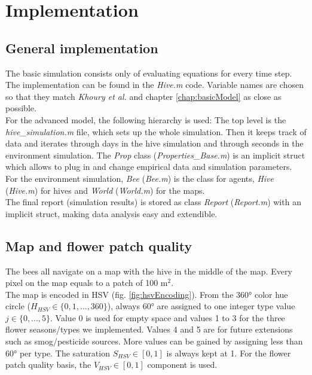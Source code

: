 \section{Implementation}
\subsection{General implementation}
	The basic simulation consists only of evaluating equations for every time step. The implementation can be found in the \textit{Hive.m} code. Variable names are chosen so that they match \textit{Khoury et al.} \cite{khoury13} and chapter \ref{chap:basicModel} as close as possible.\\
	For the advanced model, the following hierarchy is used: The top level is the \textit{hive\_simulation.m} file, which sets up the whole simulation. Then it keeps track of data and iterates through days in the hive simulation and through seconds in the environment simulation. The \textit{Prop} class (\textit{Properties\_Base.m}) is an implicit struct which allows to plug in and change empirical data and simulation parameters. For the environment simulation, \textit{Bee} (\textit{Bee.m}) is the class for agents, \textit{Hive} (\textit{Hive.m}) for hives and \textit{World} (\textit{World.m}) for the maps.\\
	The final report (simulation results) is stored as class \textit{Report} (\textit{Report.m}) with an implicit struct, making data analysis easy and extendible.\\
	
\subsection{Map and flower patch quality}
	\label{chap:mapFlowerPatchQuality}
	
	The bees all navigate on a map with the hive in the middle of the map. Every pixel on the map equals to a patch of 100 m$^2$.\\
	
	The map is encoded in HSV (fig. \ref{fig:hsvEncoding}). From the 360° color hue circle ($H_{HSV} \in \{0,1,\ldots,360\}$), always 60° are assigned to one integer type value $j \in \{0,\ldots,5\}$. Value 0 is used for empty space and values 1 to 3 for the three flower seasons/types we implemented. Values 4 and 5 are for future extensions such as smog/pesticide sources. More values can be gained by assigning less than 60° per type. The saturation $S_{HSV} \in [0,1]$ is always kept at 1. For the flower patch quality basis, the $V_{HSV} \in [0,1]$ component is used.\\
	
